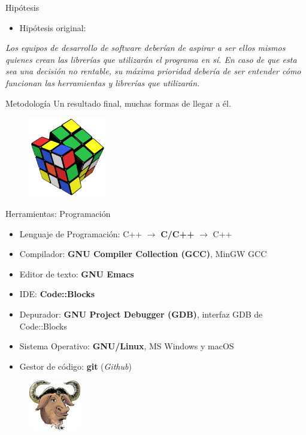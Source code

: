 \documentclass{beamer}
\begin{document}
\begin{frame}{Hipótesis}
  \begin{itemize}
    \item{Hipótesis original:}
  \end{itemize}
  \textit{Los equipos de desarrollo de software deberían de aspirar a ser ellos mismos quienes crean las librerías que utilizarán el programa en sí. En caso de que esta sea una decisión no rentable, su máxima prioridad debería de ser entender cómo funcionan las herramientas y librerías que utilizarán.}
\end{frame}

\begin{frame}{Metodología}
  Un resultado final, muchas formas de llegar a él.
  \vfill
  \begin{figure} [h]
    \centering
    \includegraphics[width=0.3\textwidth]{img/rubik}
  \end{figure}
\end{frame}

\begin{frame}{Herramientas: Programación}
  \begin{itemize}
  \item{Lenguaje de Programación: C++ $\rightarrow$ \textbf{C/C++} $\rightarrow$ C++}
  \item{Compilador: \textbf{GNU Compiler Collection (GCC)}, MinGW GCC}
  \item{Editor de texto: \textbf{GNU Emacs}}
  \item{IDE: \textbf{Code::Blocks}}
  \item{Depurador: \textbf{GNU Project Debugger (GDB)}, interfaz GDB de Code::Blocks}
  \item{Sistema Operativo: \textbf{GNU/Linux}, MS Windows y macOS}
  \item{Gestor de código: \textbf{git} (\textit{Github})}
  \end{itemize}
  \begin{figure} [h]
    \centering
    \includegraphics[width=0.2\textwidth]{img/reiss-head}
  \end{figure}
\end{frame}
\end{document}
